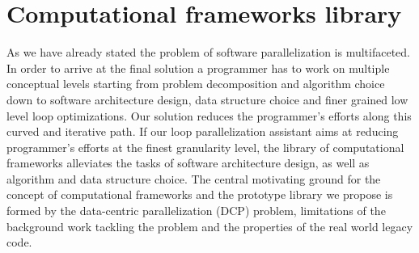 \section{Computational frameworks library}
\label{introduction_frameworks}
\quad As we have already stated the problem of software parallelization is multifaceted. In order to arrive at the final solution a programmer has to work on multiple conceptual levels starting from problem decomposition and algorithm choice down to software architecture design, data structure choice and finer grained low level loop optimizations. Our solution reduces the programmer's efforts along this curved and iterative path. If our loop parallelization assistant aims at reducing programmer's efforts at the finest granularity level, the library of computational frameworks alleviates the tasks of software architecture design, as well as algorithm and data structure choice. The central motivating ground for the concept of computational frameworks and the prototype library we propose is formed by the data-centric parallelization (DCP) problem, limitations of the background work tackling the problem and the properties of the real world legacy code.
